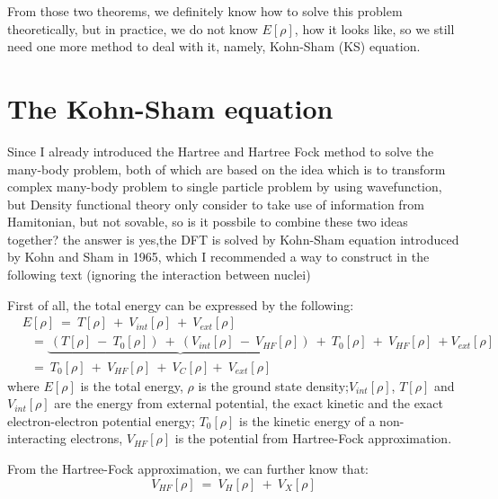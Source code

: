 \documentclass[a4paper]{report}
\begin{document}
\noindent From those two theorems, we definitely know how to solve this problem theoretically, but in practice, we do not know $E[\rho]$, how it looks like, 
so we still need one more method to deal with it, namely, Kohn-Sham (KS) equation.

\section{The Kohn-Sham equation}

\noindent Since I already introduced the Hartree and Hartree Fock method to solve the many-body problem, both of which are based on the idea which is to transform complex 
many-body problem to single particle problem by using wavefunction, but Density functional theory only consider to take use of information from Hamitonian, but not sovable, 
so is it possbile to combine these two ideas together? the answer is yes,the DFT is solved by Kohn-Sham equation introduced by Kohn and Sham in 1965,
which I recommended a way to construct in the following text (ignoring the interaction between nuclei)

\noindent First of all, the total energy can be expressed by the following:
\begin{equation}
\label{kse}
\begin{split}
&E[\rho] \ =\ T[\rho] \ + \ V_\textit{int}[\rho] \ + \ V_\textit{ext}[\rho]  \\
&\ \ \   = \underbrace{\ (T[\rho] \ - \ T_{0}[\rho]) \ + \  (V_\textit{int}[\rho] \ - \ V_\textit{HF}[\rho])\ }+ \ T_{0}[\rho] \ + \ V_\textit{HF}[\rho] \ + V_\textit{ext}[\rho]       \\
&\ \ \   = \ T_{0}[\rho] \ + \ V_\textit{HF}[\rho] \ + \ V_\textit{C}[\rho] +\ V_\textit{ext}[\rho]
\end{split}
\end{equation}
\noindent where $E[\rho]$  is the total energy, $\rho$ is the ground state density;$V_\textit{int}[\rho]$, $T[\rho]$ and $V_\textit{int}[\rho]$ are the energy from external potential, the exact kinetic 
and the exact electron-electron potential energy; $T_{0}[\rho]$ is the kinetic energy of a non-interacting electrons, $V_\textit{HF}[\rho]$ is the potential  from Hartree-Fock approximation.

\noindent From the Hartree-Fock approximation, we can further know that:
\begin{equation}
 V_\textit{HF}[\rho] \ = \ V_\textit{H}[\rho] \ + \ V_\textit{X}[\rho] 
\end{equation}
\end{document}
